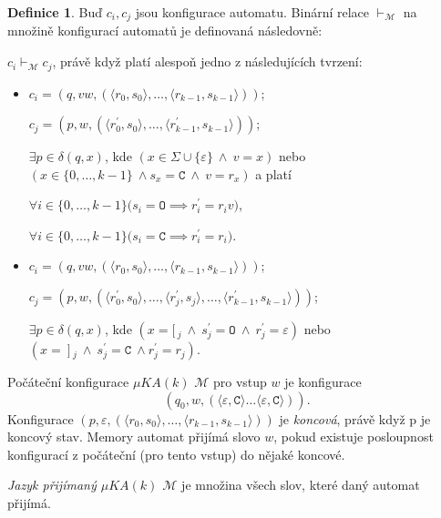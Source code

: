 \documentclass[thesis=B,czech]{FITthesis}[2019/12/23]
\theoremstyle{definition}
\newtheorem{definition}{Definice}[chapter]
\begin{document}
\begin{definition}
	Buď $c_i, c_j$ jsou konfigurace automatu. Binární relace $\vdash_{\mathcal{M}}$ na množině konfigurací automatů je definovaná následovně:
	
	$c_i \vdash_{\mathcal{M}} c_j$, právě když platí alespoň jedno z následujících tvrzení:
	\begin{itemize}
		\item $c_i=(q, vw,  (\big\langle r_0, s_0\big\rangle, \dots, \big\langle r_{k-1}, s_{k-1}\big\rangle))$;

			 $c_j = (p, w,  (\big\langle r_0^\prime, s_0\big\rangle, \dots, \big\langle r_{k-1}^\prime, s_{k-1}\big\rangle))$;

			 $\exists p \in \delta(q, x)$, kde $(x \in \Sigma \cup \{\varepsilon\} \ \wedge \ v = x)$ nebo $(x \in \{0,\dots, k-1\} \ \wedge{s_x = \texttt{C} \ \wedge \ v = r_{x} })$ a platí

			\subitem$\forall i \in \{0, \dots, k-1\} \bigg( s_i = \texttt{O} \implies r_i^\prime = r_i v\bigg)$,

			\subitem $\forall i \in \{0, \dots, k-1\} \bigg( s_i = \texttt{C} \implies r_i^\prime = r_i\bigg)$.
		\item  $c_i=(q, vw,  (\big\langle r_0, s_0\big\rangle, \dots, \big\langle r_{k-1}, s_{k-1}\big\rangle))$;

			 $c_j = (p, w,  (\big\langle r_0^\prime, s_0\big\rangle,  \dots , \big\langle r_{j}^\prime, s_{j}\big\rangle, \dots ,\big\langle r_{k-1}^\prime, s_{k-1}\big\rangle))$;
			
			 $\exists p \in \delta(q, x)$, kde $(x = [\,_j \ \wedge \ s_j^\prime = \texttt{O} \ \wedge \ r_j^\prime = \varepsilon)$ nebo $(x = \ ]\,_j \ \wedge \  {s_j^\prime = \texttt{C} \ \wedge}  {r_j^\prime = r_j})$.
			
			
	\end{itemize}
\end{definition}

Počáteční konfigurace $\mu KA(k)$ $\mathcal{M}$ pro vstup $w$ je konfigurace $$\left(q_0, w, (\langle \varepsilon, \texttt{C} \rangle \dots \langle\varepsilon, \texttt{C}\rangle)\right).$$ Konfigurace ${\left(p, \varepsilon, (\langle r_0, s_0 \rangle, \dots, \langle r_{k-1}, s_{k-1}\rangle)\right)}$ je \emph{koncová}, právě když p je koncový stav. Memory automat {přijímá slovo $w$}, pokud existuje posloupnost konfigurací z počáteční (pro tento vstup) do nějaké koncové.

\emph{Jazyk přijímaný $\mu KA(k)$ $\mathcal{M}$} je množina všech slov, které daný automat přijímá.
\end{document}
